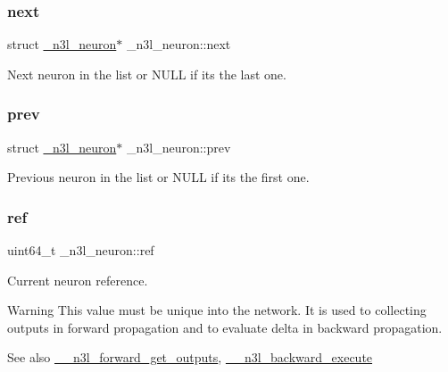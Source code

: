 \subsubsection{\texorpdfstring{next}{next}}
{\footnotesize\ttfamily struct \hyperlink{struct__n3l__neuron}{\+\_\+n3l\+\_\+neuron}$\ast$ \+\_\+n3l\+\_\+neuron\+::next}

Next neuron in the list or N\+U\+LL if it\textquotesingle{}s the last one. \mbox{\label{struct__n3l__neuron_a706ad4614fd4d1bd9a824f6ea8c0c9e5}} 
\subsubsection{\texorpdfstring{prev}{prev}}
{\footnotesize\ttfamily struct \hyperlink{struct__n3l__neuron}{\+\_\+n3l\+\_\+neuron}$\ast$ \+\_\+n3l\+\_\+neuron\+::prev}

Previous neuron in the list or N\+U\+LL if it\textquotesingle{}s the first one. \mbox{\label{struct__n3l__neuron_aa0053e003b954df3b58853f003284958}} 
\subsubsection{\texorpdfstring{ref}{ref}}
{\footnotesize\ttfamily uint64\+\_\+t \+\_\+n3l\+\_\+neuron\+::ref}

Current neuron reference. \begin{DoxyWarning}{Warning}
This value must be unique into the network. It is used to collecting outputs in forward propagation and to evaluate delta in backward propagation.
\end{DoxyWarning}
\begin{DoxySeeAlso}{See also}
\hyperlink{n3__forward_8c_ac55d957c2a3b754387f5037e87317870}{\+\_\+\+\_\+n3l\+\_\+forward\+\_\+get\+\_\+outputs}, \hyperlink{n3__backward_8c_accf39951eeeca43985b286831dd397ce}{\+\_\+\+\_\+n3l\+\_\+backward\+\_\+execute} 
\end{DoxySeeAlso}
\mbox{\label{struct__n3l__neuron_afc9c38f4676dbe2ead749f8b6c81f491}} 
